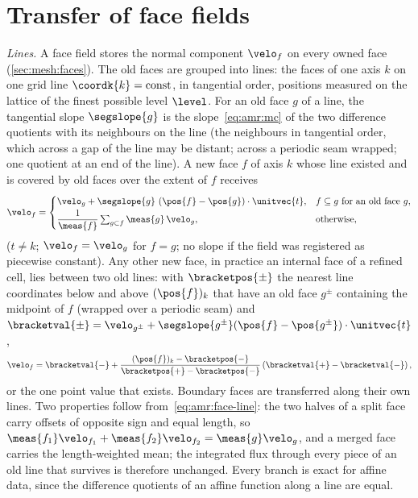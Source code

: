 \section{Transfer of face fields}\label{sec:amr:face}
\emph{Lines.} A face field stores the normal component $\velo_f$ on every
owned face (\cref{sec:mesh:faces}). The old faces are grouped into lines: the
faces of one axis $k$ on one grid line $\coordk{k}=\mathrm{const}$, in
tangential order, positions measured on the lattice of the finest possible
level $\level$. For an old face $g$ of a line, the tangential slope
$\segslope{g}$ is the slope~\cref{eq:amr:mc} of the two difference quotients
with its neighbours on the line (the neighbours in tangential order, which
across a gap of the line may be distant; across a periodic seam wrapped; one
quotient at an end of the line). A new face $f$ of axis $k$ whose line
existed and is covered by old faces over the extent of $f$ receives
\begin{equation}\label{eq:amr:face-line}
  \velo_f=\begin{cases}
    \velo_g+\segslope{g}\,\roundpar{\pos{f}-\pos{g}}\cdot\unitvec{t}, & f\subseteq g\ \text{for an old face }g,\\[2pt]
    \dfrac{1}{\meas{f}}\sum_{g\subset f}\meas{g}\,\velo_g, & \text{otherwise},
  \end{cases}
\end{equation}
($t\ne k$; $\velo_f=\velo_g$ for $f=g$; no slope if the field was registered
as piecewise constant). Any other new face, in practice an internal face of a
refined cell, lies between two old lines: with $\bracketpos{\pm}$ the nearest
line coordinates below and above $(\pos{f})_k$ that have an old face $g^{\pm}$
containing the midpoint of $f$ (wrapped over a periodic seam) and
$\bracketval{\pm}=\velo_{g^{\pm}}+\segslope{g^{\pm}}(\pos{f}-\pos{g^{\pm}})\cdot\unitvec{t}$,
\begin{equation}\label{eq:amr:face-bracket}
  \velo_f=\bracketval{-}+\frac{(\pos{f})_k-\bracketpos{-}}{\bracketpos{+}-\bracketpos{-}}\roundpar{\bracketval{+}-\bracketval{-}},
\end{equation}
or the one point value that exists. Boundary faces are transferred along
their own lines. Two properties follow from~\cref{eq:amr:face-line}: the two
halves of a split face carry offsets of opposite sign and equal length, so
$\meas{f_1}\velo_{f_1}+\meas{f_2}\velo_{f_2}=\meas{g}\velo_g$, and a merged
face carries the length-weighted mean; the integrated flux through every
piece of an old line that survives is therefore unchanged. Every branch is
exact for affine data, since the difference quotients of an affine function
along a line are equal.

